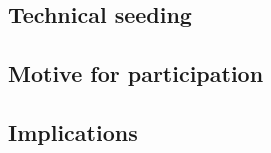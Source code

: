 \subsection{Technical seeding}


\subsection{Motive for participation}


\subsection{Implications}

